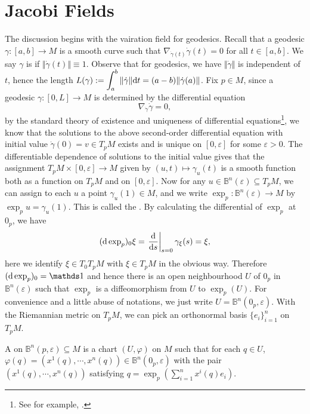 \section{Jacobi Fields}
The discussion begins with the vairation field for geodesics. Recall that a geodesic $\gamma\colon [a,b]\to M$ is a smooth curve such that $\nabla_{\dot{\gamma } (t)}\dot{\gamma } (t)=0$ for all $t\in [a,b]$. We say $\gamma $ is  if $\Vert\dot{\gamma } (t)\Vert\equiv 1$. Observe that for geodesics, we have $\Vert\dot{\gamma }\Vert $ is independent of $t$, hence the length $L(\gamma ):=\displaystyle\int_a^b\Vert\dot{\gamma }\Vert\mathrm{d} t=(a-b)\Vert\dot{\gamma } (a)\Vert $. Fix $p\in M$, since a geodesic $\gamma\colon [0,L]\to M$ is determined by the differential equation
\[
\nabla_{\dot{\gamma }}\dot{\gamma } =0,
\]
by the standard theory of existence and uniqueness of differential equations\footnote{See for example, \cite{Lefschetz1985}.}, we know that the solutions to the above second-order differential equation with initial value $\dot{\gamma } (0)=v\in T_p M$ exists and is unique on $[0,\varepsilon ]$ for some $\varepsilon >0$. The differentiable dependence of solutions to the initial value gives that the assignment $T_p M\times [0,\varepsilon ]\to M$ given by $(u,t)\mapsto\gamma_u (t)$ is a smooth function both as a function on $T_p M$ and on $[0,\varepsilon ]$. Now for any $u\in\mathbb{B}^n (\varepsilon )\subseteq T_p M$, we can assign to each $u$ a point $\gamma_u (1)\in M$, and we write $\exp_p\colon\mathbb{B}^n (\varepsilon )\to M$ by $\exp_p u=\gamma_u (1)$. This is called the . By calculating the differential of $\exp_p $ at $0_p $, we have
\[
(\mathrm{d}\exp_p )_0 \xi =\left.\frac{\mathrm{d} }{\mathrm{d} s}\right\vert_{s=0}\gamma_{\xi } (s)=\xi,
\]
here we identify $\xi\in T_0T_p M$ with $\xi \in T_p M$ in the obvious way. Therefore $(\diff\exp_p )_0 =\id $ and hence there is an open neighbourhood $U$ of $0_p $ in $\mathbb{B}^n (\varepsilon )$ such that $\exp_p $ is a diffeomorphism from $U$ to $\exp_p (U)$. For convenience and a little abuse of notations, we just write $U=\mathbb{B}^n (0_p ,\varepsilon )$. With the Riemannian metric on $T_p M$, we can pick an orthonormal basis $\{e_i\}_{i=1}^n $ on $T_p M$.
\begin{dfn}
A  on $\mathbb{B}^n (p,\varepsilon )\subseteq M$ is a chart $(U,\varphi )$ on $M$ such that for each $q\in U$, $\varphi (q)=(x^1 (q) ,\dotsb ,x^n (q))\in\mathbb{B}^n (0_p ,\varepsilon )$ with the pair $(x^1 (q),\dotsb, x^n (q))$ satisfying $q=\exp_p (\displaystyle\sum_{i=1}^n x^i (q)e_i )$.
\end{dfn}
